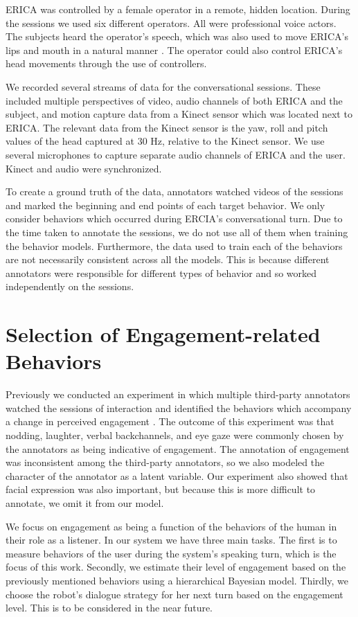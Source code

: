 \documentclass[letterpaper]{article} %
\begin{document}
ERICA was controlled by a female operator in a remote, hidden location. During the sessions we used six different operators. All were professional voice actors. The subjects heard the operator's speech, which was also used to move ERICA's lips and mouth in a natural manner \cite{Sakai2015}. The operator could also control ERICA's head movements through the use of controllers.

We recorded several streams of data for the conversational sessions. These included multiple perspectives of video, audio channels of both ERICA and the subject, and motion capture data from a Kinect sensor which was located next to ERICA. The relevant data from the Kinect sensor is the yaw, roll and pitch values of the head captured at 30 Hz, relative to the Kinect sensor. We use several microphones to capture separate audio channels of ERICA and the user. Kinect and audio were synchronized.

To create a ground truth of the data, annotators watched videos of the sessions and marked the beginning and end points of each target behavior. We only consider behaviors which occurred during ERCIA's conversational turn. Due to the time taken to annotate the sessions, we do not use all of them when training the behavior models. Furthermore, the data used to train each of the behaviors are not necessarily consistent across all the models. This is because different annotators were responsible for different types of behavior and so worked independently on the sessions.

\section{Selection of Engagement-related Behaviors} \label{engagementsection}
Previously we conducted an experiment in which multiple third-party annotators watched the sessions of interaction and identified the behaviors which accompany a change in perceived engagement \cite{Inoue2016}. The outcome of this experiment was that nodding, laughter, verbal backchannels, and eye gaze were commonly chosen by the annotators as being indicative of engagement. The annotation of engagement was inconsistent among the third-party annotators, so we also modeled the character of the annotator as a latent variable. Our experiment also showed that facial expression was also important, but because this is more difficult to annotate, we omit it from our model.

We focus on engagement as being a function of the behaviors of the human in their role as a listener. In our system we have three main tasks. The first is to measure behaviors of the user during the system's speaking turn, which is the focus of this work. Secondly, we estimate their level of engagement based on the previously mentioned behaviors using a hierarchical Bayesian model. Thirdly, we choose the robot's dialogue strategy for her next turn based on the engagement level. This is to be considered in the near future.
\end{document}
